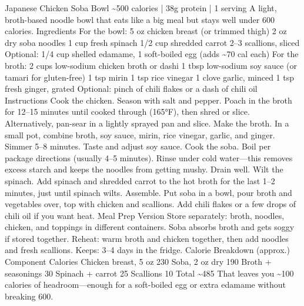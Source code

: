 Japanese Chicken Soba Bowl \~{}500 calories | 38g protein | 1 serving A light, broth-based noodle bowl that eats like a big meal but stays well under 600 calories. Ingredients For the bowl: 5 oz chicken breast (or trimmed thigh) 2 oz dry soba noodles 1 cup fresh spinach 1/2 cup shredded carrot 2–3 scallions, sliced Optional: 1/4 cup shelled edamame, 1 soft-boiled egg (adds \~{}70 cal each) For the broth: 2 cups low-sodium chicken broth or dashi 1 tbsp low-sodium soy sauce (or tamari for gluten-free) 1 tsp mirin 1 tsp rice vinegar 1 clove garlic, minced 1 tsp fresh ginger, grated Optional: pinch of chili flakes or a dash of chili oil Instructions Cook the chicken. Season with salt and pepper. Poach in the broth for 12–15 minutes until cooked through (165°F), then shred or slice. Alternatively, pan-sear in a lightly sprayed pan and slice. Make the broth. In a small pot, combine broth, soy sauce, mirin, rice vinegar, garlic, and ginger. Simmer 5–8 minutes. Taste and adjust soy sauce. Cook the soba. Boil per package directions (usually 4–5 minutes). Rinse under cold water—this removes excess starch and keeps the noodles from getting mushy. Drain well. Wilt the spinach. Add spinach and shredded carrot to the hot broth for the last 1–2 minutes, just until spinach wilts. Assemble. Put soba in a bowl, pour broth and vegetables over, top with chicken and scallions. Add chili flakes or a few drops of chili oil if you want heat. Meal Prep Version Store separately: broth, noodles, chicken, and toppings in different containers. Soba absorbs broth and gets soggy if stored together. Reheat: warm broth and chicken together, then add noodles and fresh scallions. Keeps: 3–4 days in the fridge. Calorie Breakdown (approx.) Component Calories Chicken breast, 5 oz 230 Soba, 2 oz dry 190 Broth + seasonings 30 Spinach + carrot 25 Scallions 10 Total \~{}485 That leaves you \~{}100 calories of headroom—enough for a soft-boiled egg or extra edamame without breaking 600.
\par

